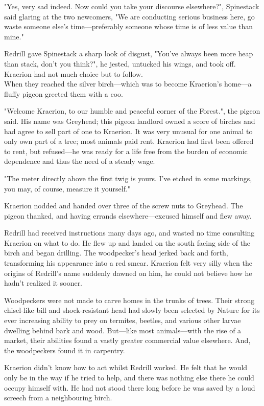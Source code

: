 "Yes, very sad indeed. Now could you take your discourse elsewhere?", Spinestack said glaring at the two newcomers, "We are conducting serious business here, go waste someone else's time---preferably someone whose time is of less value than mine."

Redrill gave Spinestack a sharp look of disgust, "You've always been more heap than stack, don't you think?", he jested, untucked his wings, and took off. Kraerion had not much choice but to follow.\\

When they reached the silver birch---which was to become Kraerion's home---a fluffy pigeon greeted them with a coo. 

"Welcome Kraerion, to our humble and peaceful corner of the Forest.", the pigeon said. His name was Greyhead; this pigeon landlord owned a score of birches and had agree to sell part of one to Kraerion. It was very unusual for one animal to only own part of a tree; most animals paid rent. Kraerion had first been offered to rent, but refused---he was ready for a life free from the burden of economic dependence and thus the need of a steady wage.

"The meter directly above the first twig is yours. I've etched in some markings, you may, of course, measure it yourself."

Kraerion nodded and handed over three of the screw nuts to Greyhead. The pigeon thanked, and having errands elsewhere---excused himself and flew away.

Redrill had received instructions many days ago, and wasted no time consulting Kraerion on what to do. He flew up and landed on the south facing side of the birch and began drilling. The woodpecker's head jerked back and forth, transforming his appearance into a red smear. Kraerion felt very silly when the origins of Redrill's name suddenly dawned on him, he could not believe how he hadn't realized it sooner.

Woodpeckers were not made to carve homes in the trunks of trees. Their strong chisel-like bill and shock-resistant head had slowly been selected by Nature for its ever increasing ability to prey on termites, beetles, and various other larvae dwelling behind bark and wood. But---like most animals---with the rise of a market, their abilities found a vastly greater commercial value elsewhere. And, the woodpeckers found it in carpentry.

Kraerion didn't know how to act whilst Redrill worked. He felt that he would only be in the way if he tried to help, and there was nothing else there he could occupy himself with. He had not stood there long before he was saved by a loud screech from a neighbouring birch.

